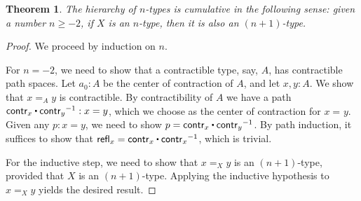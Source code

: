 \documentclass[10pt,a4paper]{article}
\newcommand{\id}[3][]{\ensuremath{#2 =_{#1} #3}\xspace}
\newcommand{\refl}[1]{\ensuremath{\mathsf{refl}_{#1}}\xspace}
\newcommand{\ct}{%
  \mathchoice{\mathbin{\raisebox{0.5ex}{$\displaystyle\centerdot$}}}%
             {\mathbin{\raisebox{0.5ex}{$\centerdot$}}}%
             {\mathbin{\raisebox{0.25ex}{$\scriptstyle\,\centerdot\,$}}}%
             {\mathbin{\raisebox{0.1ex}{$\scriptscriptstyle\,\centerdot\,$}}}
}
\newcommand{\opp}[1]{\mathord{{#1}^{-1}}}
\newcommand{\contr}{\ensuremath{\mathsf{contr}}} %
\newcommand{\nplusone}{\ensuremath{(n+1)}}
\newtheorem{thm}{Theorem}[section]
\theoremstyle{definition}
\theoremstyle{remark}
\numberwithin{equation}{section}
\begin{document}
\begin{thm}\label{thm:hlevel-cumulative}
 The hierarchy of $n$-types is cumulative in the following sense:
   given a number $n \geq -2$, if $X$ is an $n$-type, then it is also an $\nplusone$-type.
\end{thm}

\begin{proof}
 We proceed by induction on $n$.

 For $n = -2$, we need to show that a contractible type, say, $A$, has contractible path spaces.
       Let $a_0: A$ be the center of contraction of $A$, and let $x, y : A$. We show that $\id[A]{x}{y}$
       is contractible.
       By contractibility of $A$ we have a path $\contr_x \ct \opp{\contr_y} : x = y$, which we choose as
       the center of contraction for $\id{x}{y}$.
       Given any $p : x = y$, we need to show $p = \contr_x \ct \opp{\contr_y}$.
           By path induction, it suffices to show that
        $\refl{x} = \contr_x \ct \opp{\contr_x}$, which is trivial.

 For the inductive step, we need to show that $\id[X]{x}{y}$ is an $\nplusone$-type, provided
          that $X$ is an $\nplusone$-type. Applying the inductive hypothesis to $\id[X]{x}{y}$
         yields the desired result.
\end{proof}
\end{document}
